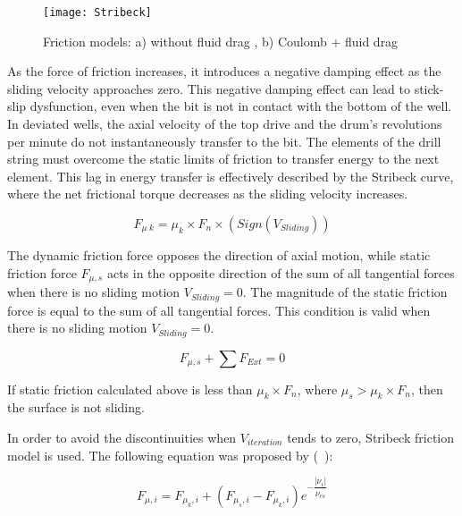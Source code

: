 \begin{figure}
  \centering
  \texttt{[image: Stribeck]}
  \caption[Comparison of friction models]{Friction models: a) without fluid drag\footnotemark{} , b) Coulomb + fluid drag\footnotemark{\value{drag}}   ~\cite{ref:cayeux2020a}}\label{Friction models}
\end{figure}

As the force of friction increases, it introduces a negative damping effect as the sliding velocity approaches zero. This negative damping effect can lead to stick-slip dysfunction, even when the bit is not in contact with the bottom of the well. In deviated wells, the axial velocity of the top drive and the drum's revolutions per minute do not instantaneously transfer to the bit. The elements of the drill string must overcome the static limits of friction to transfer energy to the next element. This lag in energy transfer is effectively described by the Stribeck curve, where the net frictional torque decreases as the sliding velocity increases.

\begin{equation}\label{dyanmic_force}
  F_{\mu\; k} = \mu_{k}\times F_{n} \times (Sign(V_{Sliding}))
\end{equation}

The dynamic friction force opposes the direction of axial motion, while static friction force $F_{\mu,s}$ acts in the opposite direction of the sum of all tangential forces when there is no sliding motion $V_{Sliding}=0$. The magnitude of the static friction force is equal to the sum of all tangential forces. This condition is valid when there is no sliding motion $V_{Sliding}=0$.

\begin{equation}\label{zero}
  F_{\mu,s} + \sum F_{Ext} = 0
\end{equation}

If static friction calculated above is less than $\mu_{k}\times F_{n}$, where $\mu_{s} > \mu_{k}\times F_{n}$, then the surface is not sliding.

In order to avoid the discontinuities when $V_{iteration}$ tends to zero, Stribeck friction model is used. The following equation was proposed by (~\cite{ref:tustin1947a}):

\begin{equation}\label{Stribeck velocity}
  F_{\mu,i} = F_{\mu_{k},i} + (F_{\mu_{s},i} - F_{\mu_{k},i})e^{-\dfrac{|\nu_{i}|}{\nu_{cs}}}
\end{equation} 

